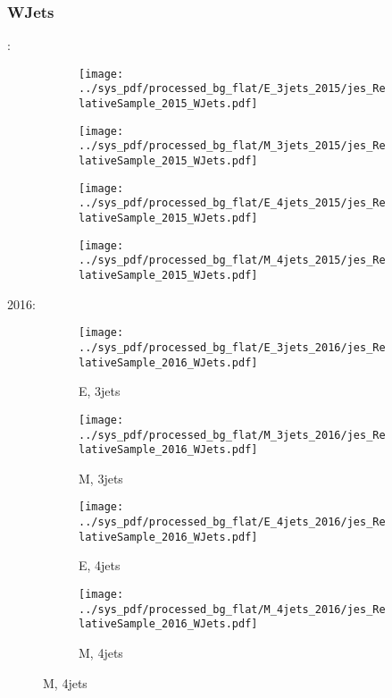 \documentclass{beamer}
\begin{document}
\begin{frame}
\frametitle{WJets}
\fontsize{5}{1}:
\begin{figure}
\centering
\begin{subfigure}[b]{0.24\textwidth}
\texttt{[image: ../sys\_pdf/processed\_bg\_flat/E\_3jets\_2015/jes\_RelativeSample\_2015\_WJets.pdf]}
\end{subfigure}
\begin{subfigure}[b]{0.24\textwidth}
\texttt{[image: ../sys\_pdf/processed\_bg\_flat/M\_3jets\_2015/jes\_RelativeSample\_2015\_WJets.pdf]}
\end{subfigure}
\begin{subfigure}[b]{0.24\textwidth}
\texttt{[image: ../sys\_pdf/processed\_bg\_flat/E\_4jets\_2015/jes\_RelativeSample\_2015\_WJets.pdf]}
\end{subfigure}
\begin{subfigure}[b]{0.24\textwidth}
\texttt{[image: ../sys\_pdf/processed\_bg\_flat/M\_4jets\_2015/jes\_RelativeSample\_2015\_WJets.pdf]}
\end{subfigure}
\end{figure}
2016:
\begin{figure}
\centering
\begin{subfigure}[b]{0.24\textwidth}
\texttt{[image: ../sys\_pdf/processed\_bg\_flat/E\_3jets\_2016/jes\_RelativeSample\_2016\_WJets.pdf]}
\captionsetup{font=tiny}
\caption{E, 3jets}
\end{subfigure}
\begin{subfigure}[b]{0.24\textwidth}
\texttt{[image: ../sys\_pdf/processed\_bg\_flat/M\_3jets\_2016/jes\_RelativeSample\_2016\_WJets.pdf]}
\captionsetup{font=tiny}
\caption{M, 3jets}
\end{subfigure}
\begin{subfigure}[b]{0.24\textwidth}
\texttt{[image: ../sys\_pdf/processed\_bg\_flat/E\_4jets\_2016/jes\_RelativeSample\_2016\_WJets.pdf]}
\captionsetup{font=tiny}
\caption{E, 4jets}
\end{subfigure}
\begin{subfigure}[b]{0.24\textwidth}
\texttt{[image: ../sys\_pdf/processed\_bg\_flat/M\_4jets\_2016/jes\_RelativeSample\_2016\_WJets.pdf]}
\captionsetup{font=tiny}
\caption{M, 4jets}
\end{subfigure}
\end{figure}
\end{frame}
\end{document}
